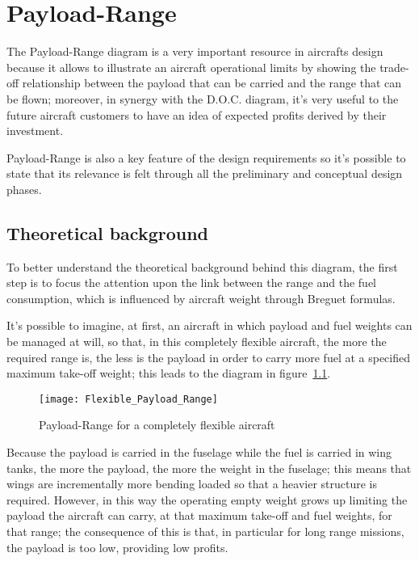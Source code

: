 \chapter{Payload-Range}
The Payload-Range diagram is a very important resource in aircrafts design because it allows to illustrate an aircraft operational limits by showing the trade-off relationship between the payload that can be carried and the range that can be flown; moreover, in synergy with the D.O.C. diagram, it’s very useful to the future aircraft customers to have an idea of expected profits derived by their investment.

Payload-Range is also a key feature of the design requirements so it’s possible to state that its relevance is felt through all the preliminary and conceptual design phases.

\section{Theoretical background}
To better understand the theoretical background behind this diagram, the first step is to focus the attention upon the link between the range and the fuel consumption, which is influenced by aircraft weight through Breguet formulas. 

It’s possible to imagine, at first, an aircraft in which payload and fuel weights can be managed at will, so that, in this completely flexible aircraft, the more the required range is, the less is the payload in order to carry more fuel at a specified maximum take-off weight; this leads to the diagram in figure~\ref{fig:Figure1}.

\begin{figure}[ht]
\centering
\texttt{[image: Flexible\_Payload\_Range]}
\caption{Payload-Range for a completely flexible aircraft}
\label{fig:Figure1}
\end{figure}

Because the payload is carried in the fuselage while the fuel is carried in wing tanks, the more the payload, the more the weight in the fuselage; this means that wings are incrementally more bending loaded so that a heavier structure is required. However, in this way the operating empty weight grows up limiting the payload the aircraft can carry, at that maximum take-off and fuel weights, for that range; the consequence of this is that, in particular for long range missions, the payload is too low, providing low profits.

